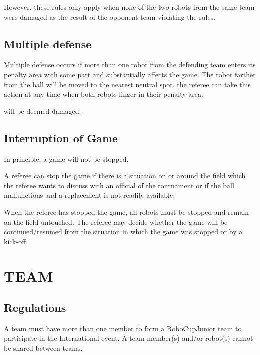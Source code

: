 \documentclass{article}
\begin{document}
However, these rules only apply when none of the two robots from the same team
were damaged as the result of the opponent team violating the rules.

\subsection{Multiple defense \label{ref-013}}

Multiple defense occurs if more than one robot from the defending team enters
its penalty area with some part and substantially affects the game. The robot
farther from the ball will be moved to the nearest neutral spot.
 the referee can take this action at any time when both
robots linger in their penalty area.

 will be deemed damaged.

\subsection{Interruption of Game \label{ref-014}}

In principle, a game will not be stopped.

A referee can stop the game if there is a situation on or around the field
which the referee wants to discuss with an official of the tournament or if the
ball malfunctions and a replacement is not readily available.

When the referee has stopped the game, all robots must be stopped and remain on
the field untouched. The referee may decide whether the game will be
continued/resumed from the situation in which the game was stopped or by a
kick-off.

\section{TEAM \label{ref-015}}

\subsection{Regulations \label{ref-016}}

A team must have more than one member to form a RoboCupJunior team to
participate in the International event. A team member(s) and/or robot(s) cannot
be shared between teams.
\end{document}
